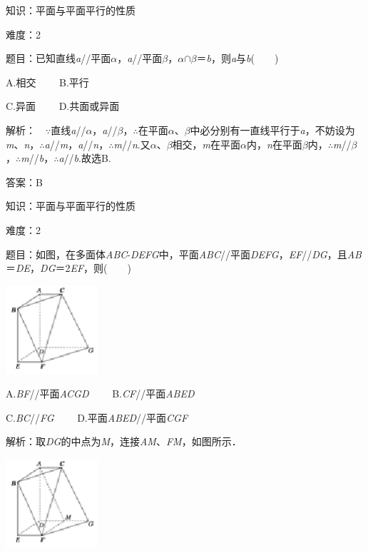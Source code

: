 \documentclass{article} %
\begin{document}
知识：平面与平面平行的性质

难度：2

题目：已知直线\textit{a}//平面\textit{$\alpha$}，\textit{a}//平面\textit{$\beta$}，\textit{$\alpha$}$\mathrm{\cap}$\textit{$\beta$}＝\textit{b}，则\textit{a}与\textit{b}(　　)

A.相交　　  B.平行

C.异面　　  D.共面或异面

解析：　$\mathrm{\because}$直线\textit{a}//\textit{$\alpha$}，\textit{a}//\textit{$\beta$}，$\mathrm{\therefore}$在平面\textit{$\alpha$}、\textit{$\beta$}中必分别有一直线平行于\textit{a}，不妨设为\textit{m}、\textit{n}，$\mathrm{\therefore}$\textit{a}//\textit{m}，\textit{a}//\textit{n}，$\mathrm{\therefore}$\textit{m}//\textit{n}.又\textit{$\alpha$}、\textit{$\beta$}相交，\textit{m}在平面\textit{$\alpha$}内，\textit{n}在平面\textit{$\beta$}内，$\mathrm{\therefore}$\textit{m}//\textit{$\beta$}，$\mathrm{\therefore}$\textit{m}//\textit{b}，$\mathrm{\therefore}$\textit{a}//\textit{b}.故选B.

答案：B

知识：平面与平面平行的性质

难度：2

题目：如图，在多面体\textit{ABC}-\textit{DEFG}中，平面\textit{ABC}//平面\textit{DEFG}，\textit{EF}//\textit{DG}，且\textit{AB}＝\textit{DE}，\textit{DG}＝2\textit{EF}，则(　　)

\includegraphics*[width=1.35in, height=1.29in, keepaspectratio=false]{image184}

A.\textit{BF}//平面\textit{ACGD}　　 B.\textit{CF}//平面\textit{ABED}

C.\textit{BC}//\textit{FG}　　  D.平面\textit{ABED}//平面\textit{CGF}

解析：取\textit{DG}的中点为\textit{M}，连接\textit{AM}、\textit{FM}，如图所示．

\includegraphics*[width=1.35in, height=1.29in, keepaspectratio=false]{image185}
\end{document}
